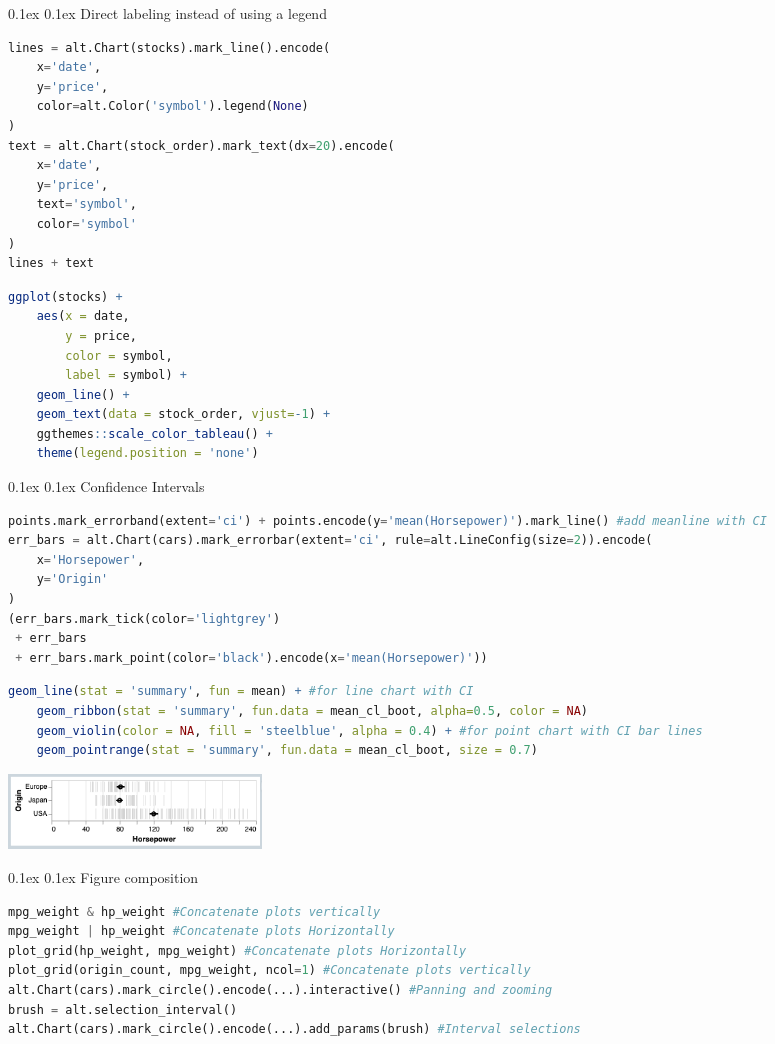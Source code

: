 \documentclass[8pt,landscape]{article}
\makeatletter
\renewcommand{\subsection}{\@startsection{subsection}{2}{0pt}%
    {0.1ex}%
    {0.1ex}%
    {\fontsize{8}{9}\bfseries\color{blue}}} %
\makeatother
\begin{document}
\begin{multicols}{3}
\subsection{Direct labeling instead of using a legend}
\begin{lstlisting}[language=Python]
lines = alt.Chart(stocks).mark_line().encode(
    x='date',
    y='price',
    color=alt.Color('symbol').legend(None)
)
text = alt.Chart(stock_order).mark_text(dx=20).encode(
    x='date',
    y='price',
    text='symbol',
    color='symbol'
)
lines + text
\end{lstlisting}
\begin{lstlisting}[language=R]
ggplot(stocks) + 
    aes(x = date,
        y = price,
        color = symbol,
        label = symbol) +
    geom_line() +
    geom_text(data = stock_order, vjust=-1) +
    ggthemes::scale_color_tableau() +
    theme(legend.position = 'none')
\end{lstlisting}

\subsection{Confidence Intervals}
\begin{lstlisting}[language=Python]
points.mark_errorband(extent='ci') + points.encode(y='mean(Horsepower)').mark_line() #add meanline with CI
err_bars = alt.Chart(cars).mark_errorbar(extent='ci', rule=alt.LineConfig(size=2)).encode(
    x='Horsepower',
    y='Origin'
)
(err_bars.mark_tick(color='lightgrey')
 + err_bars
 + err_bars.mark_point(color='black').encode(x='mean(Horsepower)'))
\end{lstlisting}
\begin{lstlisting}[language=R]
    geom_line(stat = 'summary', fun = mean) + #for line chart with CI
    geom_ribbon(stat = 'summary', fun.data = mean_cl_boot, alpha=0.5, color = NA)
    geom_violin(color = NA, fill = 'steelblue', alpha = 0.4) + #for point chart with CI bar lines
    geom_pointrange(stat = 'summary', fun.data = mean_cl_boot, size = 0.7)
\end{lstlisting}
\includegraphics[width=0.5\linewidth, height=2cm]{ci.png}

\subsection{Figure composition}
\begin{lstlisting}[language=Python]
mpg_weight & hp_weight #Concatenate plots vertically
mpg_weight | hp_weight #Concatenate plots Horizontally
plot_grid(hp_weight, mpg_weight) #Concatenate plots Horizontally
plot_grid(origin_count, mpg_weight, ncol=1) #Concatenate plots vertically
alt.Chart(cars).mark_circle().encode(...).interactive() #Panning and zooming
brush = alt.selection_interval()
alt.Chart(cars).mark_circle().encode(...).add_params(brush) #Interval selections
\end{lstlisting}


\end{multicols}
\end{document}
